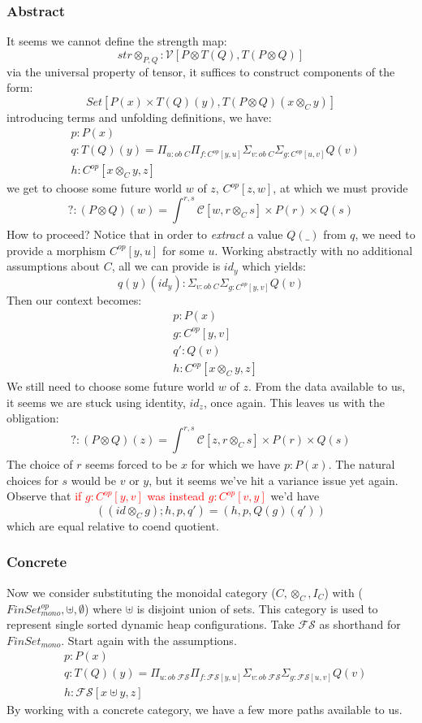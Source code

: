 \documentclass{article}
\newcommand{\red}[1]{\textcolor{red}{#1}}
\begin{document}
\subsubsection{Abstract}
It seems we cannot define the strength map:
\[
    str\otimes_{P,Q} : \mathcal{V}[ P \otimes T(Q), T (P \otimes Q)]
\]
via the universal property of tensor, it suffices to construct components of the form:
\[
    Set[P(x) \times T(Q)(y) ,T(P \otimes Q)(x \otimes_C y) ]
\]
introducing terms and unfolding definitions, we have:
\begin{align*}
    &p : P(x)\\
    &q : T(Q)(y) = \Pi_{u : ob \; C}\Pi_{f : C^{op}[ y , u]}\Sigma_{v : ob \;C}\Sigma_{g : C^{op}[ u , v ]}Q(v)\\
    &h : C^{op}[x\otimes_C y , z]
\end{align*}
we get to choose some future world $w$ of $z$, $C^{op}[z , w]$, 
at which we must provide 
\[ 
    ? : (P \otimes Q)(w) = \int_{}^{r,s} \mathcal{C}[ w , r \otimes_C s ] 
\times P(r) \times Q(s)
\]
How to proceed? Notice that in order to \textit{extract} a value $Q(\_)$ from $q$,
we need to provide a morphism $C^{op}[y , u]$ for some $u$. 
Working abstractly with no additional assumptions about $C$, all we can provide is $id_y$ which yields:
\[
    q(y)(id_y) : \Sigma_{v : ob \;C}\Sigma_{g : C^{op}[ y , v ]}Q(v)  
\]
Then our context becomes:
\begin{align*}
    &p : P(x)\\
    &g : C^{op}[ y , v ]\\
    &q' : Q(v)\\
    &h : C^{op}[x\otimes_C y , z]
\end{align*}
We still need to choose some future world $w$ of $z$.
From the data available to us, it seems we are stuck using identity, $id_z$, once again.
This leaves us with the obligation:
\[
    ? : (P \otimes Q)(z) = \int_{}^{r,s} \mathcal{C}[ z , r \otimes_C s ] 
\times P(r) \times Q(s)
\]
The choice of $r$ seems forced to be $x$ for which we have $p: P(x)$.
The natural choices for $s$ would be $v$ or $y$, but it seems we've hit a variance issue yet again.
Observe that \red{if $g: C^{op}[ y , v ]$ was instead $g : C^{op}[v , y]$} we'd have
\[
    ((id \otimes_C g) ;h , p , q') = (h , p , Q(g)(q'))
\]
which are equal relative to coend quotient.
\subsubsection{Concrete}
Now we consider substituting the monoidal category ($C, \otimes_C , I_C$) with ($FinSet_{mono}^{op}, \uplus , \emptyset $)
where $\uplus$ is disjoint union of sets.
This category is used to represent single sorted dynamic heap configurations. 
Take $\mathcal{FS}$ as shorthand for $FinSet_{mono}$. Start again with the assumptions.
\begin{align*}
    &p : P(x)\\
    &q : T(Q)(y) = \Pi_{u : ob \; \mathcal{FS}}\Pi_{f : \mathcal{FS}[ y , u]}\Sigma_{v : ob \;\mathcal{FS}}\Sigma_{g : \mathcal{FS}[ u , v ]}Q(v)\\
    &h : \mathcal{FS}[x\uplus y , z]
\end{align*}
By working with a concrete category, we have a few more paths available to us.
\end{document}
